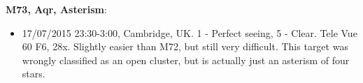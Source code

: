 {\bf M73, Aqr, Asterism}:
\begin{itemize}
\item 17/07/2015 23:30-3:00, Cambridge, UK. 1 - Perfect seeing, 5 - Clear. Tele Vue 60 F6, 28x. Slightly easier than M72, but still very difficult. This target was wrongly classified as an open cluster, but is actually just an asterism of four stars. 
\end{itemize}
